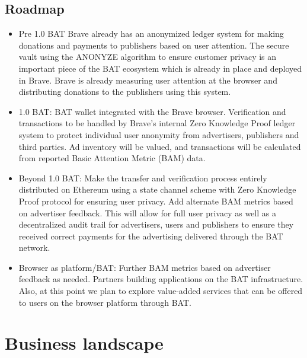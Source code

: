 \documentclass[11pt]{article}
\begin{document}
\subsection{Roadmap}
\label{sec-4-5}
\begin{itemize}
\item{Pre 1.0 BAT Brave already has an anonymized ledger system for making donations and payments to publishers based on user attention. The secure vault using the ANONYZE algorithm to ensure customer privacy is an important piece of the BAT ecosystem which is already in place and deployed in Brave. Brave is already measuring user attention at the browser and distributing donations to the publishers using this system.}
\item{1.0 BAT: BAT wallet integrated with the Brave browser. Verification and transactions to be handled by Brave's internal Zero Knowledge Proof ledger system to protect individual user anonymity from advertisers, publishers and third parties.  Ad inventory will be valued, and transactions will be calculated from reported Basic Attention Metric (BAM) data. }
\item{Beyond 1.0 BAT: Make the transfer and verification process entirely distributed on Ethereum using a state channel scheme with Zero Knowledge Proof protocol for ensuring user privacy. Add alternate BAM metrics based on advertiser feedback. This will allow for full user privacy as well as a decentralized audit trail for advertisers, users and publishers to ensure they received correct payments for the advertising delivered through the BAT network.}
\item{Browser as platform/BAT:  Further BAM metrics based on advertiser feedback as needed. Partners building applications on the BAT infrastructure. Also, at this point we plan to explore value-added services that can be offered to users on the browser platform through BAT.}
\end{itemize}


\section{Business landscape}
\label{sec-5}
\end{document}
